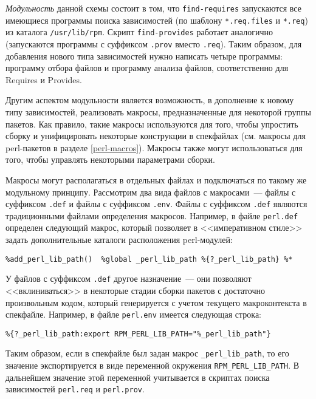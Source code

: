 \documentclass[russian,a4paper,12pt,titlepage]{article}
\begin{document}
\textit{Модульность}\label{modular-approach} данной схемы состоит в том,
что \verb|find-requires| запускаются все имеющиеся программы поиска зависимостей
(по шаблону \verb|*.req.files| и \verb|*.req|) из каталога \verb|/usr/lib/rpm|.  Скрипт \verb|find-provides| работает аналогично
(запускаются программы с суффиксом \verb|.prov| вместо \verb|.req|).  Таким образом, для добавления нового типа зависимостей
нужно написать четыре программы: программу отбора файлов и программу анализа файлов, соответственно для Requires и Provides.

Другим аспектом модульности является возможность, в дополнение к новому типу зависимостей, реализовать макросы,
предназначенные для некоторой группы пакетов.  Как правило, такие макросы используются для того, чтобы упростить
сборку и унифицировать некоторые конструкции в спекфайлах (см. макросы для perl-пакетов в разделе \ref{perl-macros}).
Макросы также могут использоваться для того, чтобы управлять некоторыми параметрами сборки.

Макросы могут располагаться в отдельных файлах и подключаться по такому же модульному принципу.
Рассмотрим два вида файлов с макросами~--- файлы с суффиксом \verb|.def| и файлы с суффиксом \verb|.env|.
Файлы с суффиксом \verb|.def|\label{def-macro-files} являются традиционными файлами определения макросов.  Например,
в файле \verb|perl.def| определен следующий макрос, который позволяет в <<императивном стиле>> задать дополнительные
каталоги расположения perl-модулей:
\begin{verbatim}
%add_perl_lib_path()  %global _perl_lib_path %{?_perl_lib_path} %*
\end{verbatim}

У файлов с суффиксом \verb|.def| другое назначение~--- они позволяют <<вклиниваться>> в некоторые стадии сборки пакетов
с достаточно произвольным кодом, который генерируется с учетом текущего макроконтекста в спекфайле.
Например, в файле \verb|perl.env|\label{perl-env-intro} имеется следующая строка:
\begin{verbatim}
%{?_perl_lib_path:export RPM_PERL_LIB_PATH="%_perl_lib_path"}
\end{verbatim}
Таким образом, если в спекфайле был задан макрос \verb|_perl_lib_path|, то его значение экспортируется
в виде переменной окружения \verb|RPM_PERL_LIB_PATH|.  В дальнейшем значение этой переменной учитывается
в скриптах поиска зависимостей \verb|perl.req| и \verb|perl.prov|.
\end{document}

